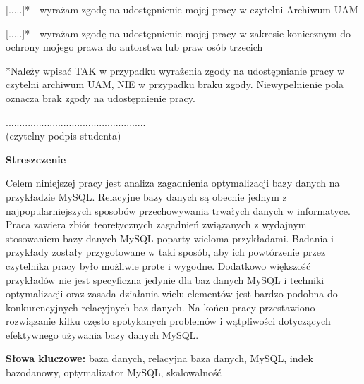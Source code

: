 \documentclass[11pt,a4paper,leqno]{article}
\newcommand{\totalemptypage}{\newpage\thispagestyle{empty}\null\newpage}
\begin{document}
[.....]* - wyrażam zgodę na udostępnienie mojej pracy w czytelni Archiwum UAM

[.....]* - wyrażam zgodę na udostępnienie mojej pracy w zakresie koniecznym do ochrony mojego prawa do autorstwa lub praw osób trzecich

*Należy wpisać TAK w przypadku wyrażenia zgody na udostępnianie pracy w czytelni archiwum UAM, NIE w przypadku braku zgody. Niewypełnienie pola oznacza brak zgody na udostępnienie pracy.

\vspace{0.75 cm}

\begin{flushright}
	...................................................\\
	(czytelny podpis studenta)
\end{flushright}


\totalemptypage



\thispagestyle{empty}

{\Large \textbf{Streszczenie}}

\vspace{0.5 cm}

Celem niniejszej pracy jest analiza zagadnienia optymalizacji bazy danych na przykładzie MySQL. Relacyjne bazy danych są obecnie jednym z najpopularniejszych sposobów przechowywania trwałych danych w informatyce. Praca zawiera zbiór teoretycznych zagadnień związanych z wydajnym stosowaniem bazy danych MySQL poparty wieloma przykładami. Badania i przykłady zostały przygotowane w taki sposób, aby ich powtórzenie przez czytelnika pracy było możliwie prote i wygodne. Dodatkowo większość przykładów nie jest specyficzna jedynie dla baz danych MySQL i techniki optymalizacji oraz zasada działania wielu elementów jest bardzo podobna do konkurencyjnych relacyjnych baz danych. Na końcu pracy przestawiono rozwiązanie kilku często spotykanych problemów i wątpliwości dotyczących efektywnego używania bazy danych MySQL. 
\vspace{0.5 cm}

{ \textbf{Słowa kluczowe: }} 
baza danych, relacyjna baza danych, MySQL, indek bazodanowy, optymalizator MySQL, skalowalność


\totalemptypage

\end{document}
